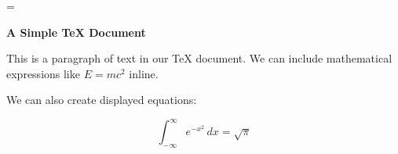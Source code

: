 
\magnification= %

\centerline{\bf A Simple TeX Document} %

\medskip %

This is a paragraph of text in our TeX document. We can include
mathematical expressions like $E = mc^2$ inline.

\bigskip %

We can also create displayed equations:

$$
\int_{-\infty}^\infty e^{-x^2} \, dx = \sqrt{\pi}
$$

\bye %
